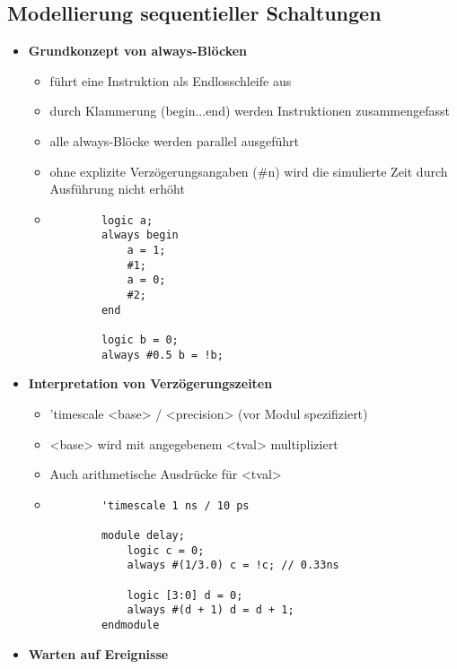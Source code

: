 \subsection{Modellierung sequentieller Schaltungen}
\begin{itemize}

\item \textbf{Grundkonzept von always-Blöcken}
	\begin{itemize}
	\item führt eine Instruktion als Endlosschleife aus
	\item durch Klammerung (begin...end) werden Instruktionen zusammengefasst
	\item alle always-Blöcke werden parallel ausgeführt
	\item ohne explizite Verzögerungsangaben (\#n) wird die simulierte Zeit durch Ausführung nicht erhöht
	\item[]
		\begin{lstlisting}
		logic a;
		always begin
			a = 1;
			#1;
			a = 0;
			#2;
		end
		
		logic b = 0;
		always #0.5 b = !b;
		\end{lstlisting}
	\end{itemize}
	
\pagebreak	
	
\item \textbf{Interpretation von Verzögerungszeiten}
	\begin{itemize}
	\item 'timescale <base> / <precision> 	(vor Modul spezifiziert)
	\item <base> wird mit angegebenem <tval> multipliziert
	\item Auch arithmetische Ausdrücke für <tval>
	\item[]
		\begin{lstlisting}
		'timescale 1 ns / 10 ps
		
		module delay;
			logic c = 0;
			always #(1/3.0) c = !c; // 0.33ns
			
			logic [3:0] d = 0;
			always #(d + 1) d = d + 1;
		endmodule				
		\end{lstlisting}
	
	
	\end{itemize}
	
\item \textbf{Warten auf Ereignisse}
	\begin{itemize}
		

\end{itemize}
\end{itemize}
